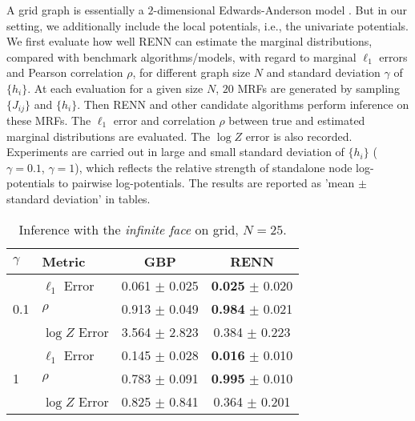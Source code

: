 A grid graph is essentially a $2$-dimensional Edwards-Anderson model \cite{Edwards_1975}. But in our setting, we additionally include the local potentials, i.e., the univariate potentials. We first evaluate how well RENN can estimate the marginal distributions, compared with benchmark algorithms/models, with regard to marginal $\ell_1$ errors and Pearson correlation $\rho$, for different graph size $N$ and standard deviation $\gamma$ of $\{h_i\}$. At each evaluation for a given size $N$, $20$ MRFs are generated by sampling $\{J_{ij}\}$ and $\{h_i\}$. Then RENN and other candidate algorithms perform inference on these MRFs. The $\ell_1$ error and correlation $\rho$ between true and estimated marginal distributions are evaluated. The $\log{Z}$ error is also recorded.
Experiments are carried out in large and small standard deviation of $\{h_i\}$ ($\gamma=0.1$, $\gamma=1$), which reflects the relative strength of standalone node log-potentials to pairwise log-potentials. The results are reported as 'mean $\pm$ standard deviation' in tables.

\begin{table}[tp!]
  \caption{Inference with the \textit{infinite face} on grid, $N=25$.}
  \label{tab:infer-infinite-face}
  \begin{center}
    \begin{small}
      
      \begin{tabular}{llcc}
        \toprule
        $\gamma$ & Metric & GBP & RENN \\
        \midrule
        \multirow{3}{*}{0.1}
                 & $\ell_1$ Error & 0.061 $\pm$ 0.025 & \textbf{0.025} $\pm$ 0.020 \\

                 & $\rho$   & 0.913 $\pm$ 0.049  &  \textbf{0.984} $\pm$ 0.021  \\
                 & $\log{Z}$ Error & 3.564 $\pm$ 2.823  &  0.384 $\pm$ 0.223  \\
        \midrule
        \multirow{3}{*}{1}
                 & $\ell_1$ Error & 0.145 $\pm$ 0.028  & \textbf{0.016} $\pm$ 0.010 \\

                 & $\rho$   & 0.783 $\pm$ 0.091  &  \textbf{0.995} $\pm$ 0.010 \\
                 & $\log{Z}$ Error & 0.825 $\pm$ 0.841  & 0.364 $\pm$ 0.201 \\
        
        \bottomrule
      \end{tabular}

    \end{small}
  \end{center}
\end{table}





